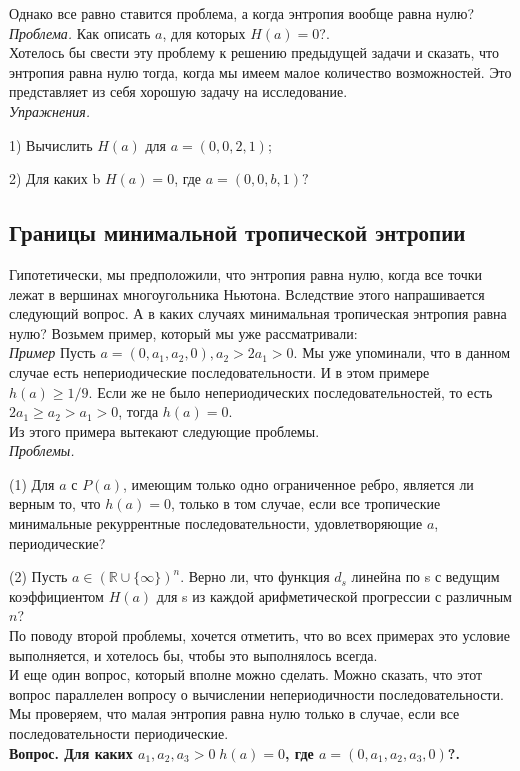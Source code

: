 \documentclass[russian]{lecture-notes}
\begin{document}
Однако все равно ставится проблема, а когда энтропия вообще равна нулю?\\

\emph{ Проблема.}  Как описать $a$, для которых $H(a)=0$?.\\

Хотелось бы свести эту проблему к решению предыдущей задачи и сказать, что энтропия равна нулю тогда, когда мы имеем малое количество возможностей. Это представляет из себя хорошую задачу на исследование.\\

\emph{Упражнения.}

1) Вычислить $H(a)$ для $a = (0,0,2,1);$

2) Для каких b $H(a) = 0$, где $a = (0,0,b,1)?$
\subsection{Границы минимальной тропической энтропии}


Гипотетически, мы предположили, что энтропия равна нулю, когда все точки лежат в вершинах многоугольника Ньютона. Вследствие этого напрашивается следующий вопрос. А в каких случаях минимальная тропическая энтропия равна нулю? Возьмем пример, который мы уже рассматривали:\\

\emph{ Пример} Пусть $a=(0,a_1,a_2,0), a_2>2a_1>0.$ Мы уже упоминали, что в данном случае есть непериодические последовательности. И в этом примере $h(a) \ge 1/9$. Если же не было непериодических последовательностей, то есть $2a_1 \ge a_2>a_1>0$, тогда $h(a) = 0$.\\

Из этого примера вытекают следующие проблемы.\\

\emph{ Проблемы.}

(1) Для $a$ с $P(a)$, имеющим только одно ограниченное ребро, является ли верным то, что $h(a) = 0$, только в том случае, если все тропические минимальные рекуррентные последовательности, удовлетворяющие $a$, периодические?

(2) Пусть $a \in (\mathbb{R} \cup \{ \infty \})^n$. Верно ли, что функция $d_s$ линейна по s с ведущим коэффициентом $H(a)$ для s из каждой арифметической прогрессии с различным $n$?\\

По поводу второй проблемы, хочется отметить, что во всех примерах это условие выполняется, и хотелось бы, чтобы это выполнялось всегда.\\

И еще один вопрос, который вполне можно сделать. Можно сказать, что этот вопрос параллелен вопросу о вычислении непериодичности последовательности. Мы проверяем, что малая энтропия равна нулю только в случае, если все последовательности периодические.\\

\bfseries Вопрос. \mdseries Для каких $a_1,a_2,a_3>0 \; h(a) =0$, где $a=(0,a_1,a_2,a_3,0)$?.
\end{document}
